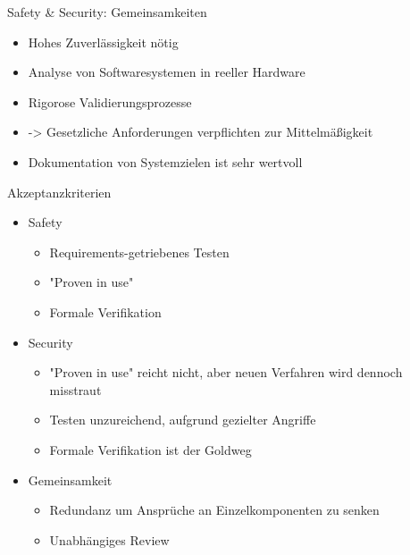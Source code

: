\begin{frame}[T]{Safety \& Security: Gemeinsamkeiten}
  \begin{itemize}
    \item Hohes Zuverlässigkeit nötig
    \item Analyse von Softwaresystemen in reeller Hardware
    \item Rigorose Validierungsprozesse
    \item -> Gesetzliche Anforderungen verpflichten zur Mittelmäßigkeit
    \item Dokumentation von Systemzielen ist sehr wertvoll
  \end{itemize}
\end{frame}

%
\begin{frame}[T]{Akzeptanzkriterien}
  \begin{itemize}
    \item Safety
    \begin{itemize}
      \item Requirements-getriebenes Testen %
      \item "Proven in use" %
      \item Formale Verifikation %
    \end{itemize}

    \item Security
    \begin{itemize}
      \item "Proven in use" reicht nicht, aber neuen Verfahren wird dennoch misstraut
      \item Testen unzureichend, aufgrund gezielter Angriffe
      \item Formale Verifikation ist der Goldweg
    \end{itemize}

    \item Gemeinsamkeit
    \begin{itemize}
      \item Redundanz um Ansprüche an Einzelkomponenten zu senken
      \item Unabhängiges Review
    \end{itemize}
  \end{itemize}
\end{frame}

